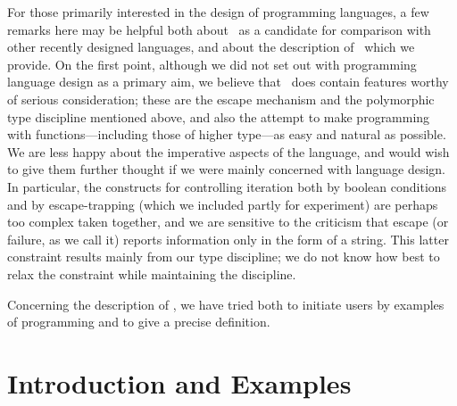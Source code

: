\documentclass[11pt]{article}
\begin{document}
For those primarily interested in the design of programming languages, a few
remarks here may be helpful both about \ML\ as a candidate for comparison with
other recently designed languages, and about the description of \ML\ which we
provide. On the first point, although we did not set out with programming
language design as a primary aim, we believe that \ML\ does contain features
worthy of serious consideration; these are the escape mechanism and the
polymorphic type discipline mentioned above, and also the attempt to make
programming with functions---including those of higher type---as easy and
natural as possible.  We are less happy about the imperative aspects of the
language, and would wish to give them further thought if we were mainly
concerned with language design. In particular, the constructs for controlling
iteration both by boolean conditions and by escape-trapping (which we included
partly for experiment) are perhaps too complex taken together, and we are
sensitive to the criticism that escape (or failure, as we call it) reports
information only in the form of a string. This latter constraint results mainly
from our type discipline; we do not know how best to relax the constraint while
maintaining the discipline.

Concerning the description of \ML, we have tried both to initiate users by
examples of programming and to give a precise definition.





\section{Introduction and Examples}
\label{sec:ML-intro}

%
%
\end{document}
